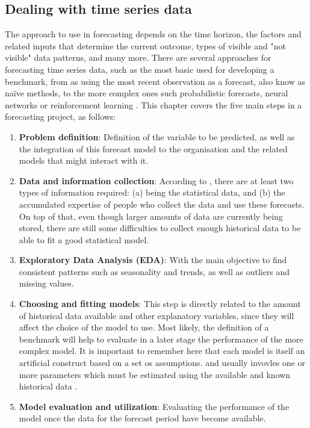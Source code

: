 \subsection{Dealing with time series data}
The approach to use in forecasting depends on the time horizon, the factors and related inputs that determine the current outcome, types of visible and "not visible" data patterns, and many more. There are several approaches for forecasting time series data, such as the most basic used for developing a benchmark, from as using the most recent observation as a forecast, also know as na\"{i}ve methods, to the more complex ones such probabilistic forecasts, neural networks or reinforcement learning \cite{Hyndman2021}. This chapter covers the five main steps in a forecasting project, as follows: 
\begin{enumerate}
\item \textbf{Problem definition}: Definition of the variable to be predicted, as well as the integration of this forecast model to the organisation and the related models that might interact with it. 
\item \textbf{Data and information collection}: According to \cite{Hyndman2021}, there are at least two types of information required: (a) being the statistical data, and (b) the accumulated expertise of people who collect the data and use these forecasts. On top of that, even though larger amounts of data are currently being stored, there are still some difficulties to collect enough historical data to be able to fit a good statistical model. 
\item \textbf{Exploratory Data Analysis (EDA)}: With the main objective to find consistent patterns such as seasonality and trends, as well as outliers and missing values. 
\item \textbf{Choosing and fitting models}: This step is directly related to the amount of historical data available and other explanatory variables, since they will affect the choice of the model to use. Most likely, the definition of a benchmark will help to evaluate in a later stage the performance of the more complex model. It is important to remember here that each model is itself an artificial construct based on a set os assumptions. and usually invovles one or more parameters which must be estimated using the available and known historical data  \cite{Hyndman2021}. 
\item \textbf{Model evaluation and utilization}: Evaluating the performance of the model once the data for the forecast period have become available.
\end{enumerate}

